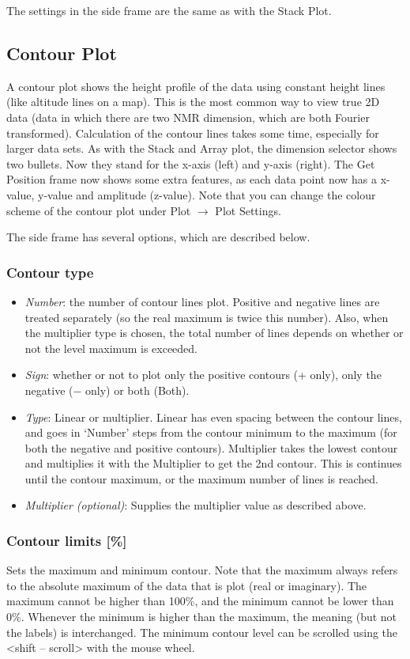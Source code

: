 \documentclass[11pt,a4paper]{article}
\begin{document}
The settings in the side frame are the same as with the Stack Plot.


\subsection{Contour Plot}
A contour plot shows the height profile of the data using constant height lines (like altitude lines on a
map). This is the most common way to view true 2D data (data in which there are two NMR dimension, which are
both Fourier transformed). Calculation of the contour lines takes some time, especially for larger data sets.
As with the Stack and Array plot, the dimension selector shows two bullets. Now they stand for the x-axis
(left) and y-axis (right). The Get Position frame now shows some extra features, as each data point now has a
x-value, y-value and amplitude (z-value). Note that you can change the colour scheme of the contour plot under
Plot $\rightarrow$ Plot Settings.

The side frame has several options, which are described below.

\subsubsection*{Contour type}
\begin{itemize}
  \item \textit{Number}: the number of contour lines plot. Positive and negative lines are treated separately (so the real maximum is twice this number). Also, when 
	 the multiplier type is chosen, the total number of lines depends on whether or not the level maximum is exceeded.
  \item \textit{Sign}: whether or not to plot only the positive contours (+ only), only the negative ($-$ only) or both (Both).
  \item \textit{Type}: Linear or multiplier. Linear has even spacing between the contour lines, and goes in `Number' steps from the contour minimum to the
	 maximum (for both the negative and positive contours). Multiplier takes the lowest contour and multiplies it with the Multiplier to get the 2nd contour. This is continues
	 until the contour maximum, or the maximum number of lines is reached.
  \item \textit{Multiplier (optional)}: Supplies the multiplier value as described above.
\end{itemize}


\subsubsection*{Contour limits [\%]}
Sets the maximum and minimum contour. Note that the maximum always refers to the absolute maximum of the data that is plot (real or imaginary).
The maximum cannot be higher than 100\%, and the minimum cannot be lower than 0\%. Whenever the minimum is higher than the maximum, 
the meaning (but not the labels) is interchanged. The minimum contour level can be scrolled using the <shift -- scroll> with the mouse wheel.
\end{document}
